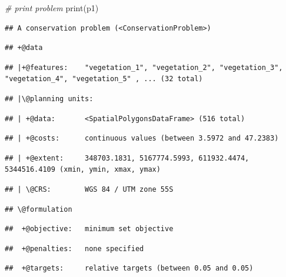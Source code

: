 \documentclass[
  12pt,
]{book}
\newenvironment{Shaded}{\begin{snugshade}}{\end{snugshade}}
\newcommand{\CommentTok}[1]{\textcolor[rgb]{0.56,0.35,0.01}{\textit{#1}}}
\newcommand{\FunctionTok}[1]{\textcolor[rgb]{0.00,0.00,0.00}{#1}}
\newcommand{\NormalTok}[1]{#1}
\begin{document}
\begin{Shaded}
\begin{Highlighting}[]
\CommentTok{\# print problem}
\FunctionTok{print}\NormalTok{(p1)}
\end{Highlighting}
\end{Shaded}

\begin{verbatim}
## A conservation problem (<ConservationProblem>)
\end{verbatim}

\begin{verbatim}
## +@data
\end{verbatim}

\begin{verbatim}
## |+@features:    "vegetation_1", "vegetation_2", "vegetation_3", "vegetation_4", "vegetation_5" , ... (32 total)
\end{verbatim}

\begin{verbatim}
## |\@planning units:
\end{verbatim}

\begin{verbatim}
## | +@data:       <SpatialPolygonsDataFrame> (516 total)
\end{verbatim}

\begin{verbatim}
## | +@costs:      continuous values (between 3.5972 and 47.2383)
\end{verbatim}

\begin{verbatim}
## | +@extent:     348703.1831, 5167774.5993, 611932.4474, 5344516.4109 (xmin, ymin, xmax, ymax)
\end{verbatim}

\begin{verbatim}
## | \@CRS:        WGS 84 / UTM zone 55S
\end{verbatim}

\begin{verbatim}
## \@formulation
\end{verbatim}

\begin{verbatim}
##  +@objective:   minimum set objective
\end{verbatim}

\begin{verbatim}
##  +@penalties:   none specified
\end{verbatim}

\begin{verbatim}
##  +@targets:     relative targets (between 0.05 and 0.05)
\end{verbatim}
\end{document}
